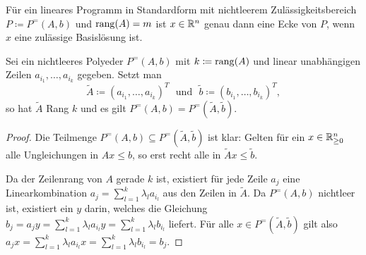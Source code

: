 \begin{satz}\label{satz-ecke-basislsg}
Für ein lineares Programm in Standardform mit nichtleerem Zulässigkeitsbereich $P\coloneq P^=(A,b)$ und $\operatorname{rang}(A) = m$ ist $x\in\mathbb{R}^n$ genau dann eine Ecke von $P$, wenn $x$ eine zulässige Basislösung ist.
\end{satz}

\begin{proposition}\label{prop-rank-obda-m}
	Sei ein nichtleeres Polyeder $P^=(A, b)$ mit $k\coloneq \operatorname{rang}(A)$ und linear unabhängigen Zeilen $a_{i_1},\dots, a_{i_k}$ gegeben.
	Setzt man \[
	\tilde{A}\coloneq (a_{i_1}, \dots, a_{i_k})^T\text{~ und ~}\tilde{b}\coloneq (b_{i_1}, \dots, b_{i_k})^T, \]
	 so hat $\tilde{A}$ Rang $k$ und es gilt $P^=(A,b) = P^=(\tilde{A}, \tilde{b})$.
\end{proposition}
\begin{proof}
	Die Teilmenge $P^=(A,b)\subseteq P^=(\tilde{A}, \tilde{b})$ ist klar:
	Gelten für ein $x\in\mathbb{R}^n_{\geq0}$ alle Ungleichungen in $Ax \leq b$, so erst recht alle in $\tilde{A}x \leq \tilde{b}$.
	
	Da der Zeilenrang von $A$ gerade $k$ ist, existiert für jede Zeile $a_j$ eine Linearkombination $a_j=\sum_{l=1}^k \lambda_l a_{i_l}$ aus den Zeilen in $\tilde{A}$.
	Da $P^=(A,b)$ nichtleer ist, existiert ein $y$ darin, welches die Gleichung
	$b_j = a_j y = \sum_{l=1}^k \lambda_l a_{i_l} y = \sum_{l=1}^k \lambda_l b_{i_l}$ liefert.
	Für alle $x\in P^=(\tilde{A}, \tilde{b})$ gilt also $a_j x = \sum_{l=1}^k \lambda_l a_{i_l} x = \sum_{l=1}^k \lambda_l b_{i_l} = b_j$.
\end{proof}

